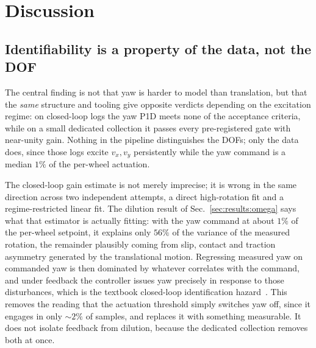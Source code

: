 \section{Discussion}
\label{sec:discussion}

\subsection{Identifiability is a property of the data, not the DOF}
\label{sec:discussion:inversion}
The central finding is not that yaw is harder to model than translation, but
that the \emph{same} structure and tooling give opposite verdicts depending on
the excitation regime: on closed-loop logs the yaw P1D meets none of the
acceptance criteria, while on a small dedicated collection it passes every
pre-registered gate with near-unity gain. Nothing in the pipeline distinguishes
the DOFs; only the data does, since those logs excite $v_x,v_y$ persistently
while the yaw command is a median $1\%$ of the per-wheel actuation.

The closed-loop gain estimate is not merely imprecise; it is wrong in the same
direction across two independent attempts, a direct high-rotation fit and a
regime-restricted linear fit. The dilution result of
Sec.~\ref{sec:results:omega} says what that estimator is actually fitting:
with the yaw command at about $1\%$ of the per-wheel setpoint, it explains only
$56\%$ of the variance of the measured rotation, the remainder plausibly coming
from slip, contact and traction asymmetry generated by the translational motion. Regressing
measured yaw on commanded yaw is then dominated by whatever correlates with the
command, and under feedback the controller issues yaw precisely in response to
those disturbances, which is the textbook closed-loop identification
hazard~\cite{gustavsson1977identification,vandenhof1998closedloop,forssell1999closedloop}.
This removes the reading that the actuation threshold simply switches yaw off,
since it engages in only ${\sim}2\%$ of samples, and replaces it with something
measurable. It does not isolate feedback from dilution, because the dedicated
collection removes both at once.

